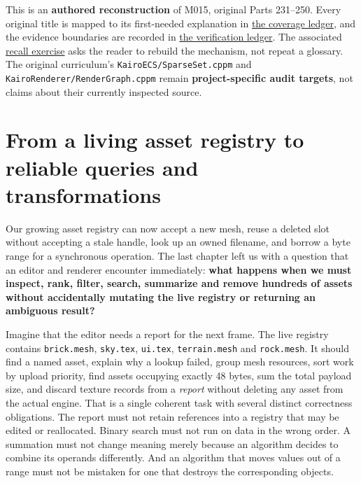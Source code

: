 This is an \textbf{authored reconstruction} of M015, original Parts 231--250. Every original title is mapped to its first-needed explanation in \hyperref[appendix-fd090d982a15-m015-parts-231250-growing-the-asset-registry-without-losing-identities]{the coverage ledger}, and the evidence boundaries are recorded in \hyperref[appendix-a103e7846d21-phase-5-additive-reconstruction-m015-parts-231250]{the verification ledger}. The associated \hyperref[appendix-960160274237-a-growing-asset-store-must-preserve-its-promises-m015-retrieval]{recall exercise} asks the reader to rebuild the mechanism, not repeat a glossary. The original curriculum's \texttt{KairoECS/SparseSet.cppm} and \texttt{KairoRenderer/RenderGraph.cppm} remain \textbf{project-specific audit targets}, not claims about their currently inspected source.

\section{From a living asset registry to reliable queries and transformations}\label{01-foundations-i-ch006-from-a-living-asset-registry-to-reliable-queries-and-transformations}

Our growing asset registry can now accept a new mesh, reuse a deleted slot without accepting a stale handle, look up an owned filename, and borrow a byte range for a synchronous operation. The last chapter left us with a question that an editor and renderer encounter immediately: \textbf{what happens when we must inspect, rank, filter, search, summarize and remove hundreds of assets without accidentally mutating the live registry or returning an ambiguous result?}

Imagine that the editor needs a report for the next frame. The live registry contains \texttt{brick.mesh}, \texttt{sky.tex}, \texttt{ui.tex}, \texttt{terrain.mesh} and \texttt{rock.mesh}. It should find a named asset, explain why a lookup failed, group mesh resources, sort work by upload priority, find assets occupying exactly 48 bytes, sum the total payload size, and discard texture records from a \emph{report} without deleting any asset from the actual engine. That is a single coherent task with several distinct correctness obligations. The report must not retain references into a registry that may be edited or reallocated. Binary search must not run on data in the wrong order. A summation must not change meaning merely because an algorithm decides to combine its operands differently. And an algorithm that moves values out of a range must not be mistaken for one that destroys the corresponding objects.

